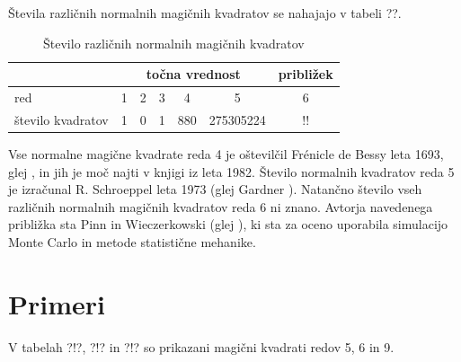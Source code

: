 \documentclass[a4paper,12pt]{article}
\begin{document}
Števila različnih normalnih magičnih kvadratov se nahajajo v tabeli ??.

         \begin{table}   
            \caption{Število različnih normalnih magičnih kvadratov}
            \label{table:stevila}
            \centering
            \begin{tabular}{lcccccc}\toprule
               \hline
            
                           &\multicolumn{5}{c}{točna vrednost} & približek\\\midrule
                   red               & 1 & 2 & 3 & 4   & 5        & 6 \\
                   število kvadratov & 1 & 0 & 1 & 880 & 275305224& !! \\
               \bottomrule 
            \end{tabular}

         \end{table}
    

Vse normalne magične kvadrate reda 4 je oštevilčil Frénicle de Bessy
leta 1693, glej \cite{bessy}, in jih je moč najti v knjigi \cite{berlekamp}
iz leta 1982. Število normalnih kvadratov reda 5 je izračunal
R. Schroeppel leta 1973 (glej Gardner \cite{gardner}).
Natančno število vseh različnih normalnih magičnih kvadratov reda 6 ni znano.
Avtorja navedenega približka sta Pinn in Wieczerkowski (glej \cite{pinn}), ki
sta za oceno uporabila simulacijo Monte Carlo in metode statistične mehanike.


\section{Primeri}

V tabelah ?!?, ?!? in ?!? so prikazani
magični kvadrati redov 5, 6 in 9.

\end{document}
